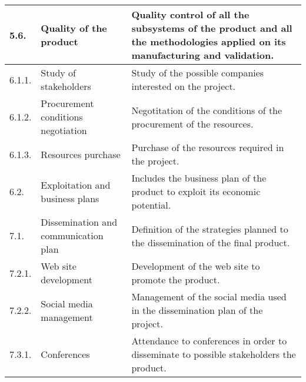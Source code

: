 \begin{longtable}[H]{l >{\raggedright\arraybackslash}p{4cm} p{8cm}}
	\midrule
	
	5.6. & Quality of the product & Quality control of all the subsystems of the product and all the methodologies applied on its manufacturing and validation.\vspace{0.2cm} \\
	
	\midrule
	
	6.1.1. & Study of stakeholders & Study of the possible companies interested on the project.\vspace{0.2cm} \\
	
	\midrule
	
	6.1.2. & Procurement conditions negotiation & Negotitation of the conditions of the procurement of the resources.\vspace{0.2cm} \\
	
	\midrule
	
	6.1.3. & Resources purchase & Purchase of the resources required in the project.\vspace{0.2cm} \\
	
	\midrule
	
	6.2. & Exploitation and business plans & Includes the business plan of the product to exploit its economic potential.\vspace{0.2cm} \\

	\midrule
	
	7.1. & Dissemination and communication plan & Definition of the strategies planned to the dissemination of the final product.\vspace{0.2cm} \\
	
	\midrule
	
	7.2.1. & Web site development & Development of the web site to promote the product.\vspace{0.2cm} \\
	
	\midrule
	
	7.2.2. & Social media management & Management of the social media used in the dissemination plan of the project.\vspace{0.2cm} \\
	
	\midrule
	
	7.3.1. & Conferences & Attendance to conferences in order to disseminate to possible stakeholders the product.\vspace{0.2cm} \\
	

\end{longtable}
